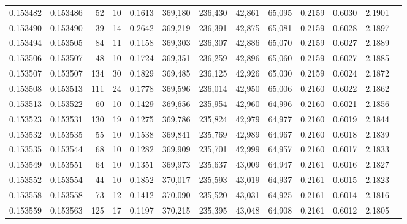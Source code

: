 \begin{tabular}{rrrrrrrrrrrrr}
0.153482 & 0.153486 &    52 &  10 &                                     0.1613 & 369,180 & 236,430 &  42,861 &  65,095 & 0.2159 & 0.6030 & 2.1901 \\
0.153490 & 0.153490 &    39 &  14 &                                     0.2642 & 369,219 & 236,391 &  42,875 &  65,081 & 0.2159 & 0.6028 & 2.1897 \\
0.153494 & 0.153505 &    84 &  11 &                                     0.1158 & 369,303 & 236,307 &  42,886 &  65,070 & 0.2159 & 0.6027 & 2.1889 \\
0.153506 & 0.153507 &    48 &  10 &                                     0.1724 & 369,351 & 236,259 &  42,896 &  65,060 & 0.2159 & 0.6027 & 2.1885 \\
0.153507 & 0.153507 &   134 &  30 &                                     0.1829 & 369,485 & 236,125 &  42,926 &  65,030 & 0.2159 & 0.6024 & 2.1872 \\
0.153508 & 0.153513 &   111 &  24 &                                     0.1778 & 369,596 & 236,014 &  42,950 &  65,006 & 0.2160 & 0.6022 & 2.1862 \\
0.153513 & 0.153522 &    60 &  10 &                                     0.1429 & 369,656 & 235,954 &  42,960 &  64,996 & 0.2160 & 0.6021 & 2.1856 \\
0.153523 & 0.153531 &   130 &  19 &                                     0.1275 & 369,786 & 235,824 &  42,979 &  64,977 & 0.2160 & 0.6019 & 2.1844 \\
0.153532 & 0.153535 &    55 &  10 &                                     0.1538 & 369,841 & 235,769 &  42,989 &  64,967 & 0.2160 & 0.6018 & 2.1839 \\
0.153535 & 0.153544 &    68 &  10 &                                     0.1282 & 369,909 & 235,701 &  42,999 &  64,957 & 0.2160 & 0.6017 & 2.1833 \\
0.153549 & 0.153551 &    64 &  10 &                                     0.1351 & 369,973 & 235,637 &  43,009 &  64,947 & 0.2161 & 0.6016 & 2.1827 \\
0.153552 & 0.153554 &    44 &  10 &                                     0.1852 & 370,017 & 235,593 &  43,019 &  64,937 & 0.2161 & 0.6015 & 2.1823 \\
0.153558 & 0.153558 &    73 &  12 &                                     0.1412 & 370,090 & 235,520 &  43,031 &  64,925 & 0.2161 & 0.6014 & 2.1816 \\
0.153559 & 0.153563 &   125 &  17 &                                     0.1197 & 370,215 & 235,395 &  43,048 &  64,908 & 0.2161 & 0.6012 & 2.1805 \\

\end{tabular}
